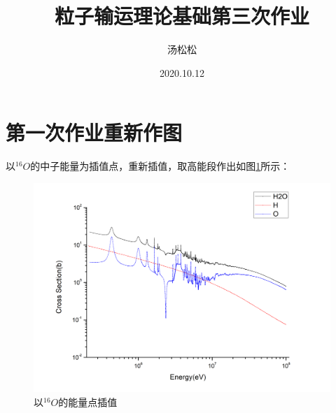 \documentclass[12pt]{ctexart}
\title{粒子输运理论基础第三次作业}
\author{汤松松 }
\date{2020.10.12}
\begin{document}
\maketitle

\section{第一次作业重新作图}
以$^{16}O$的中子能量为插值点，重新插值，取高能段作出如图\ref{fig:water_o}所示：
\begin{figure}[H]
    \centering
    \includegraphics[width=\textwidth]{img/Neutron section in water interpolate based O.png}
    \caption{以$^{16}O$的能量点插值}
    \label{fig:water_o}
\end{figure}
\end{document}
